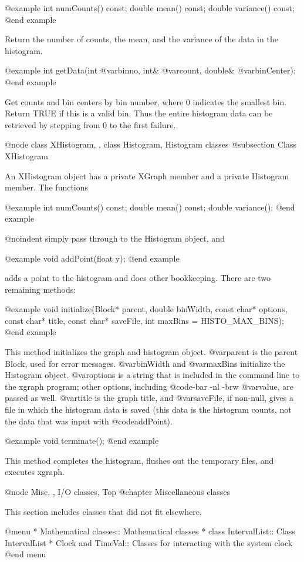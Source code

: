 @example
int numCounts() const;
double mean() const;
double variance() const;
@end example

Return the number of counts, the mean, and the variance of the data
in the histogram.

@example
int getData(int @var{binno}, int& @var{count}, double& @var{binCenter});
@end example

Get counts and bin centers by bin number, where 0 indicates the smallest
bin.  Return TRUE if this is a valid bin.  Thus the entire histogram
data can be retrieved by stepping from 0 to the first failure.

@node class XHistogram,  , class Histogram, Histogram classes
@subsection Class XHistogram

An XHistogram object has a private XGraph member and a private Histogram
member.  The functions

@example
int numCounts() const;
double mean() const;
double variance();
@end example

@noindent
simply pass through to the Histogram object, and

@example
void addPoint(float y);
@end example

adds a point to the histogram and does other bookkeeping.  There
are two remaining methods:

@example
void initialize(Block* parent, double binWidth,
   const char* options, const char* title,
   const char* saveFile, int maxBins = HISTO_MAX_BINS);
@end example

This method initializes the graph and histogram object.  @var{parent}
is the parent Block, used for error messages.  @var{binWidth} and
@var{maxBins} initialize the Histogram object.  @var{options} is a
string that is included in the command line to the xgraph program;
other options, including @code{-bar -nl -brw @var{value}}, are passed as
well.  @var{title} is the graph title, and @var{saveFile}, if non-null,
gives a file in which the histogram data is saved (this data is the
histogram counts, not the data that was input with @code{addPoint}).

@example
void terminate();
@end example

This method completes the histogram, flushes out the temporary files,
and executes xgraph.

@node Misc,  , I/O classes, Top
@chapter Miscellaneous classes

This section includes classes that did not fit elsewhere.

@menu
* Mathematical classes::  Mathematical classes
* class IntervalList::  Class IntervalList
* Clock and TimeVal::  Classes for interacting with the system clock
@end menu

